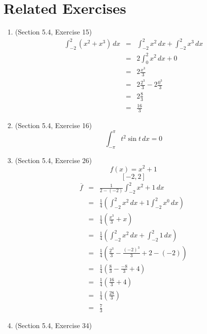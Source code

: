 \documentclass{article}
\begin{document}
\section*{Related Exercises}
\begin{enumerate}
    \item (Section 5.4, Exercise 15)
        \begin{eqnarray}
            \int_{-2}^2{\left(x^2 + x^3\right)\,dx} &=& \int_{-2}^2{x^2\,dx} + \int_{-2}^2{x^3\,dx} \\
                                                    &=& 2\int_{0}^2{x^2\,dx} + 0 \\
                                                    &=& 2\frac{x^3}{3} \\
                                                    &=& 2\frac{2^3}{3} - 2\frac{0^3}{3} \\
                                                    &=& 2\frac{8}{3} \\
                                                    &=& \frac{16}{3}
        \end{eqnarray}
    \item (Section 5.4, Exercise 16)
        $$\int_{-\pi}^{\pi}{t^2\sin{t}\,dx} = 0$$
    \item (Section 5.4, Exercise 26)
        $$f(x) = x^2 + 1$$
        $$[-2, 2]$$
        \begin{eqnarray}
            \overline{f} &=& \frac{1}{2 - (-2)}\int_{-2}^2{x^2 + 1\,dx} \\
                         &=& \frac{1}{4}\left(\int_{-2}^2{x^2\,dx} + 1\int_{-2}^2{x^0\,dx}\right) \\
                         &=& \frac{1}{4}\left(\frac{x^3}{3} + x\right) \\
                         &=& \frac{1}{4}\left(\int_{-2}^2{x^2\,dx} + \int_{-2}^2{1\,dx}\right) \\
                         &=& \frac{1}{4}\left(\frac{2^3}{3} - \frac{(-2)^3}{3} + 2 - (-2)\right) \\
                         &=& \frac{1}{4}\left(\frac{8}{3} - \frac{-8}{3} + 4\right) \\
                         &=& \frac{1}{4}\left(\frac{16}{3} + 4\right) \\
                         &=& \frac{1}{4}\left(\frac{28}{3}\right) \\
                         &=& \frac{7}{3}
        \end{eqnarray}
    \item (Section 5.4, Exercise 34)

\end{enumerate}
\end{document}
